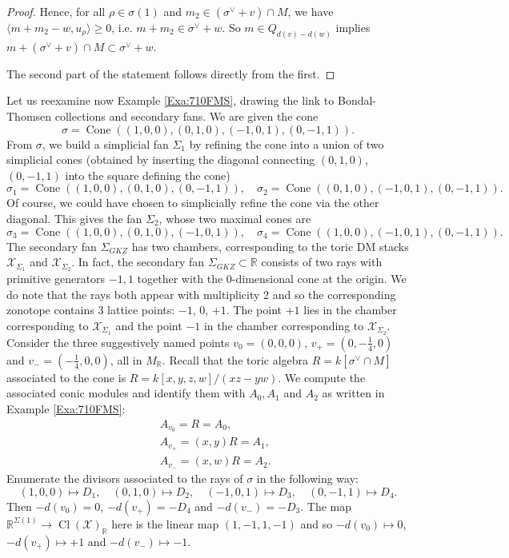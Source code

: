 \documentclass[reqno, 12pt]{amsart}
\theoremstyle{definition}
\numberwithin{equation}{section}
\newcommand{\R}{\mathbb{R}}
\newcommand{\cone}{\operatorname{Cone}}
\begin{document}
\begin{proof}
Hence, for all $\rho\in\sigma(1)$ and $m_2\in (\sigma^\vee+v)\cap M$, we have $\langle m+m_2-w,u_\rho\rangle\ge0$, i.e. $m+m_2\in \sigma^\vee+w$. So $m\in Q_{d(v)-d(w)}$ implies $m+(\sigma^\vee+v)\cap M\subset \sigma^\vee+w$. 

The second part of the statement follows directly from the first.
\end{proof}

Let us reexamine now Example \ref{Exa:710FMS}, drawing the link to Bondal-Thomsen collections and secondary fans. We are given the cone \[
\sigma=\cone((1,0,0),(0,1,0),(-1,0,1),(0,-1,1)).
\]
From $\sigma$, we build a simplicial fan $\Sigma_1$ by refining the cone into a union of two simplicial cones (obtained by inserting the diagonal connecting $(0,1,0)$, $(0,-1,1)$ into the square defining the cone) \[
\sigma_1=\cone((1,0,0),(0,1,0),(0,-1,1)),\quad \sigma_2=\cone((0,1,0),(-1,0,1),(0,-1,1)).
\]
Of course, we could have chosen to simplicially refine the cone via the other diagonal. This gives the fan $\Sigma_2$, whose two maximal cones are \[
\sigma_3=\cone((1,0,0),(0,1,0),(-1,0,1)),\quad \sigma_4=\cone((1,0,0),(-1,0,1),(0,-1,1)).
\]
The secondary fan $\Sigma_{GKZ}$ has two chambers, corresponding to the toric DM stacks $\mathcal{X}_{\Sigma_1}$ and $\mathcal{X}_{\Sigma_2}$. In fact, the secondary fan $\Sigma_{GKZ}\subset \R$ consists of two rays with primitive generators $-1,1$ together with the 0-dimensional cone at the origin. We do note that the rays both appear with multiplicity 2 and so the corresponding zonotope contains 3 lattice points: $-1$, $0$, $+1$. The point $+1$ lies in the chamber corresponding to $\mathcal{X}_{\Sigma_1}$ and the point $-1$ in the chamber corresponding to $\mathcal{X}_{\Sigma_2}$. Consider the three suggestively named points $v_0=(0,0,0)$, $v_{+}=(0,-\frac{1}{4},0)$ and $v_{-}=(-\frac{1}{4},0,0)$, all in $M_\R$. Recall that the toric algebra $R=k[\sigma^\vee\cap M]$ associated to the cone is $R=k[x,y,z,w]/(xz-yw)$. We compute the associated conic modules and identify them with $A_0, A_1$ and $A_2$ as written in Example \ref{Exa:710FMS}:
\begin{eqnarray*}
    && A_{v_0}=R=A_0,\\
    && A_{v_+}=(x,y)R=A_1,\\
    && A_{v_-}=(x,w)R=A_2.\;
\end{eqnarray*}
Enumerate the divisors associated to the rays of $\sigma$ in the following way:
\[
   (1,0,0) \mapsto D_1, \quad
    (0,1,0)\mapsto D_2, \quad
    (-1,0,1)\mapsto D_3, \quad  
    (0,-1,1)\mapsto D_4.
\]
Then $-d(v_0)=0$, $-d(v_{+})=-D_4$ and $-d(v_{-})=-D_3$. The map $\R^{\Sigma(1)}\rightarrow \operatorname{Cl}(\mathcal{X})_{\R}$ here is the linear map $(1,-1,1,-1)$ and so $-d(v_0)\mapsto 0$, $-d(v_+)\mapsto +1$ and $-d(v_-)\mapsto -1$. 
\end{document}
